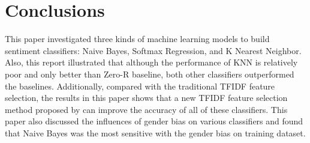\documentclass[11pt]{article}
\begin{document}
\section{Conclusions}
This paper investigated three kinds of machine learning models to build sentiment classifiers: Naive Bayes, Softmax Regression, and K Nearest Neighbor.  Also, this report illustrated that although the performance of KNN is relatively poor and only better than Zero-R baseline, both other classifiers outperformed the baselines. Additionally, compared with the traditional TFIDF feature selection, the results in this paper shows that a new TFIDF feature selection method proposed by \cite{Zhou2007} can improve the accuracy of all of these classifiers. This paper also discussed the influences of gender bias on various classifiers and found that Naive Bayes was the most sensitive with the gender bias on training dataset.
\nocite{*}


\end{document}

